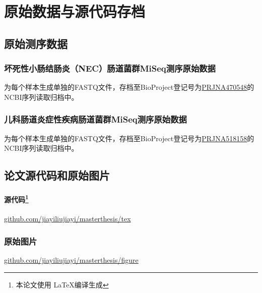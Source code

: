 \chapter{原始数据与源代码存档}
\label{app:archive}

\section{原始测序数据}
  \subsection{坏死性小肠结肠炎（NEC）肠道菌群MiSeq测序原始数据}
  为每个样本生成单独的FASTQ文件，存档至BioProject登记号为\href{https://www.ncbi.nlm.nih.gov/bioproject/PRJNA470548}{PRJNA470548}的NCBI序列读取归档中。
  \subsection{儿科肠道炎症性疾病肠道菌群MiSeq测序原始数据}
  为每个样本生成单独的FASTQ文件，存档至BioProject登记号为\href{https://www.ncbi.nlm.nih.gov/bioproject/PRJNA518158}{PRJNA518158}的NCBI序列读取归档中。

\section{论文源代码和原始图片}
  \subsubsection{源代码\protect\footnote{本论文使用 \LaTeX 编译生成}}
  \href{github.com/jiayiliujiayi/masterthesis/tex}{github.com/jiayiliujiayi/masterthesis/tex}
  \subsection{原始图片}
  \href{github.com/jiayiliujiayi/masterthesis/figure}{github.com/jiayiliujiayi/masterthesis/figure}
